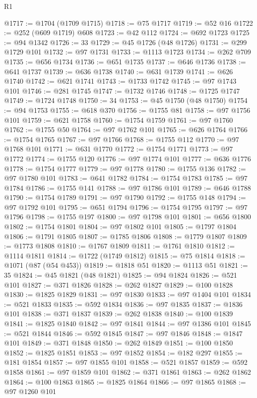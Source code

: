 \begin{lexlean}{R1}
\begin{coremodule}
@1717 := @1704 (@1709 @1715)
@1718 := @75 @1717
@1719 := @52 @16
@1722 := @252 (@609 @1719) @608
@1723 := @42 @112
@1724 := @692 @1723
@1725 := @94 @1342
@1726 := 33
@1729 := @45 @1726 (@48 @1726)
@1731 := @299 @1729 @101
@1732 := @97 @1731
@1733 := @1113 @1723
@1734 := @262 @709
@1735 := @656 @1734
@1736 := @651 @1735
@1737 := @646 @1736
@1738 := @641 @1737
@1739 := @636 @1738
@1740 := @631 @1739
@1741 := @626 @1740
@1742 := @621 @1741
@1743 := @1733 @1742
@1745 := @97 @1743 @101
@1746 := @281 @1745
@1747 := @1732 @1746
@1748 := @1725 @1747
@1749 := @1724 @1748
@1750 := 34
@1753 := @45 @1750 (@48 @1750)
@1754 := @94 @1753
@1755 := @618 @370
@1756 := @1755 @81
@1758 := @97 @1756 @101
@1759 := @621 @1758
@1760 := @1754 @1759
@1761 := @97 @1760
@1762 := @1755 @50
@1764 := @97 @1762 @101
@1765 := @626 @1764
@1766 := @1754 @1765
@1767 := @97 @1766
@1768 := @1755 @112
@1770 := @97 @1768 @101
@1771 := @631 @1770
@1772 := @1754 @1771
@1773 := @97 @1772
@1774 := @1755 @120
@1776 := @97 @1774 @101
@1777 := @636 @1776
@1778 := @1754 @1777
@1779 := @97 @1778
@1780 := @1755 @136
@1782 := @97 @1780 @101
@1783 := @641 @1782
@1784 := @1754 @1783
@1785 := @97 @1784
@1786 := @1755 @141
@1788 := @97 @1786 @101
@1789 := @646 @1788
@1790 := @1754 @1789
@1791 := @97 @1790
@1792 := @1755 @148
@1794 := @97 @1792 @101
@1795 := @651 @1794
@1796 := @1754 @1795
@1797 := @97 @1796
@1798 := @1755 @197
@1800 := @97 @1798 @101
@1801 := @656 @1800
@1802 := @1754 @1801
@1804 := @97 @1802 @101
@1805 := @1797 @1804
@1806 := @1791 @1805
@1807 := @1785 @1806
@1808 := @1779 @1807
@1809 := @1773 @1808
@1810 := @1767 @1809
@1811 := @1761 @1810
@1812 := @1114 @1811
@1814 := @1722 (@1749 @1812)
@1815 := @75 @1814
@1818 := @1071 (@87 (@54 @453))
@1819 := @1818 @51
@1820 := @1113 @51
@1821 := 35
@1824 := @45 @1821 (@48 @1821)
@1825 := @94 @1824
@1826 := @521 @101
@1827 := @371 @1826
@1828 := @262 @1827
@1829 := @100 @1828
@1830 := @1825 @1829
@1831 := @97 @1830
@1833 := @97 @1404 @101
@1834 := @521 @1833
@1835 := @592 @1834
@1836 := @97 @1835
@1837 := @1836 @101
@1838 := @371 @1837
@1839 := @262 @1838
@1840 := @100 @1839
@1841 := @1825 @1840
@1842 := @97 @1841
@1844 := @97 @1386 @101
@1845 := @521 @1844
@1846 := @592 @1845
@1847 := @97 @1846
@1848 := @1847 @101
@1849 := @371 @1848
@1850 := @262 @1849
@1851 := @100 @1850
@1852 := @1825 @1851
@1853 := @97 @1852
@1854 := @182 @297
@1855 := @181 @1854
@1857 := @97 @1855 @101
@1858 := @521 @1857
@1859 := @592 @1858
@1861 := @97 @1859 @101
@1862 := @371 @1861
@1863 := @262 @1862
@1864 := @100 @1863
@1865 := @1825 @1864
@1866 := @97 @1865
@1868 := @97 @1260 @101

\end{coremodule}
\end{lexlean}
